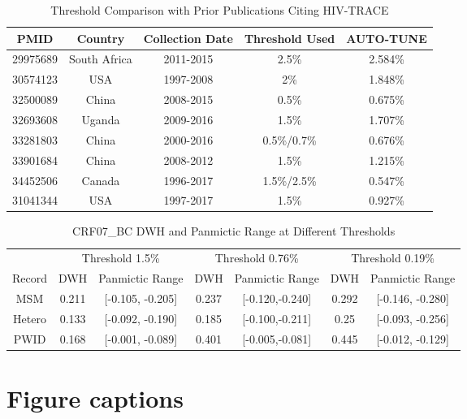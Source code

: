 \documentclass[utf8]{FrontiersinHarvard} %
\begin{document}
\begin{table}[h]
\caption{Threshold Comparison with Prior Publications Citing HIV-TRACE}
\vspace{10pt}
\centering
\label{tab:paperComparison}
\begin{tabular}{|c|c|c|c|c|}
\hline
PMID & Country & Collection Date & Threshold Used & AUTO-TUNE \\
\hline
29975689 & South Africa & 2011-2015 & 2.5\% & 2.584\% \\
30574123 & USA & 1997-2008 & 2\% & 1.848\% \\
32500089 & China & 2008-2015 & 0.5\% & 0.675\% \\
32693608 & Uganda & 2009-2016 & 1.5\% & 1.707\% \\
33281803 & China & 2000-2016 & 0.5\%/0.7\% & 0.676\% \\
33901684 & China & 2008-2012 & 1.5\% & 1.215\% \\
34452506 & Canada & 1996-2017 & 1.5\%/2.5\% & 0.547\% \\
31041344 & USA & 1997-2017 & 1.5\% & 0.927\% \\
\hline
\end{tabular}
\end{table}

\begin{table}[h]
\caption{CRF07\_BC DWH and Panmictic Range at Different Thresholds}
\label{tab:combined}
\centering
\begin{tabular}{|c|c|c|c|c|c|c|}
\hline
& \multicolumn{2}{c|}{Threshold 1.5\%} & \multicolumn{2}{c|}{Threshold 0.76\%} & \multicolumn{2}{c|}{Threshold 0.19\%} \\
\cline{2-7}
Record & DWH & Panmictic Range & DWH & Panmictic Range & DWH & Panmictic Range \\
\hline
MSM & 0.211 & [-0.105, -0.205] & 0.237 & [-0.120,-0.240] & 0.292 & [-0.146, -0.280] \\
Hetero & 0.133 & [-0.092, -0.190] & 0.185 & [-0.100,-0.211] & 0.25 & [-0.093, -0.256] \\
PWID & 0.168 & [-0.001, -0.089] & 0.401 & [-0.005,-0.081] & 0.445 & [-0.012, -0.129] \\
\hline
\end{tabular}
\end{table}

\section{Figure captions}
\end{document}
